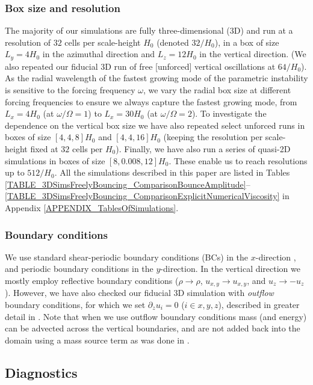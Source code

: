 \documentclass[fleqn,usenatbib]{mnras}
\begin{document}
\subsubsection{Box size and resolution}
\label{METHODS_BoxSizeAndResolution}
The majority of our simulations are fully three-dimensional (3D) and run at a resolution of $32$ cells per scale-height $H_0$ (denoted $32/H_0$), in a box of size $L_y = 4H_0$ in the azimuthal direction and $L_z = 12H_0$ in the vertical direction. (We also repeated our fiducial 3D run of free [unforced] vertical oscillations at $64/H_0$). As the radial wavelength of the fastest growing mode of the parametric instability is sensitive to the forcing frequency $\omega$, we vary the radial box size at different forcing frequencies to ensure we always capture the fastest growing mode, from $L_x = 4H_0$ (at $\omega/\Omega = 1$) to $L_x = 30H_0$ (at $\omega/\Omega = 2$). To investigate the dependence on the vertical box size we have also repeated select unforced runs in boxes of size $[4,4,8]H_0$ and $[4,4,16]H_0$ (keeping the resolution per scale-height fixed at $32$ cells per $H_0$). Finally, we have also run a series of quasi-2D simulations in boxes of size $[8,0.008, 12]H_0$. These enable us to reach resolutions up to $512/H_0$. All the simulations described in this paper are listed in Tables \ref{TABLE_3DSimsFreelyBouncing_ComparisonBounceAmplitude}--\ref{TABLE_3DSimsFreelyBouncing_ComparisonExplicitNumericalViscosity} in Appendix \ref{APPENDIX_TablesOfSimulations}.

\subsubsection{Boundary conditions}
\label{METHODS_BoundaryConditions}
We use standard shear-periodic boundary conditions (BCs) in the $x$-direction \cite[see][]{hawley1995}, and periodic boundary conditions in the $y$-direction. In the vertical direction we mostly employ reflective boundary conditions ($\rho \rightarrow \rho$, $u_{x,y} \rightarrow u_{x,y}$, and $u_z \rightarrow -u_z$). However, we have also checked our fiducial 3D simulation with \textit{outflow} boundary conditions, for which we set $\partial_z u_i = 0$ ($i \in {x,y,z}$), described in greater detail in \cite{held2024mri}. Note that when we use outflow boundary conditions mass (and energy) can be advected across the vertical boundaries, and are not added back into the domain using a mass source term as was done in \cite{held2024mri}. 

\subsection{Diagnostics}
\label{METHODS_Diagnostics}
\end{document}
